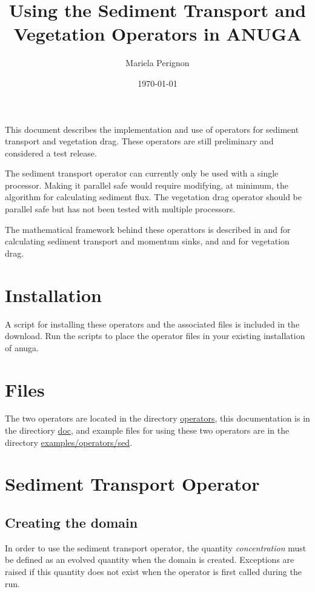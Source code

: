 \documentclass[10pt]{article}
\begin{document}
\title{Using the Sediment Transport and Vegetation Operators in ANUGA}
\author{Mariela Perignon}
\date{\today}
\maketitle

This document describes the implementation and use of operators for sediment transport and vegetation drag. These operators are still preliminary and considered a test release.

The sediment transport operator can currently only be used with a single processor. Making it parallel safe would require modifying, at minimum, the algorithm for calculating sediment flux. The vegetation drag operator should be parallel safe but has not been tested with multiple processors.

The mathematical framework behind these operattors is described in \citet{Simpson:2006aa} and \citet{davy2009fluvial} for calculating sediment transport and momentum sinks, and \citet{nepf1999drag} and \citet{kean2006form} for vegetation drag.

\section{Installation}

A script for installing these operators and the associated files is included in the download. Run the scripts to place the operator files in your existing installation of anuga.

\section{Files}

The two operators are located in the directory \url{operators}, this documentation is in the directiory \url{doc}, and example files for using these two operators are in the directory \url{examples/operators/sed}.

\section{Sediment Transport Operator}

\subsection{Creating the domain}\label{domain}

In order to use the sediment transport operator, the quantity \textit{concentration} must be defined as an evolved quantity when the domain is created. Exceptions are raised if this quantity does not exist when the operator is first called during the run.
\ \\
\end{document}

